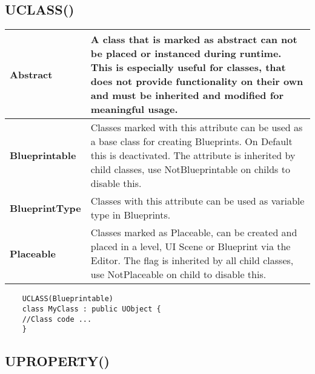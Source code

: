 \documentclass[10pt,a4paper]{article}
\begin{document}
\begin{multicols*}{2}
	\subsection{UCLASS()}
	\begin{tabularx}{\columnwidth}{|l|X|}
		\hline \textbf{Abstract}
		& A class that is marked as abstract can not be placed or instanced during runtime. This is especially useful for classes, that does not provide functionality on their own and must be inherited and modified for meaningful usage.\\
		\hline \textbf{Blueprintable}
		& Classes marked with this attribute can be used as a base class for creating Blueprints. On Default this is deactivated. The attribute is inherited by child classes, use NotBlueprintable on childs to disable this. \\
		\hline \textbf{BlueprintType}
		& Classes with this attribute can be used as variable type in Blueprints. \\
		\hline \textbf{Placeable}
		& Classes marked as Placeable, can be created and placed in a level, UI Scene or Blueprint via the Editor. The flag is inherited by all child classes, use NotPlaceable on child to disable this. \\
		\hline
	\end{tabularx}
	
	\begin{verbatim}
	UCLASS(Blueprintable)
	class MyClass : public UObject {
	//Class code ...
	}
	\end{verbatim}
	
	\subsection{UPROPERTY()}
	
	\begin{tabularx}{\columnwidth}{|p{3.5cm}|X|}
		

\end{tabularx}
\end{multicols*}
\end{document}
